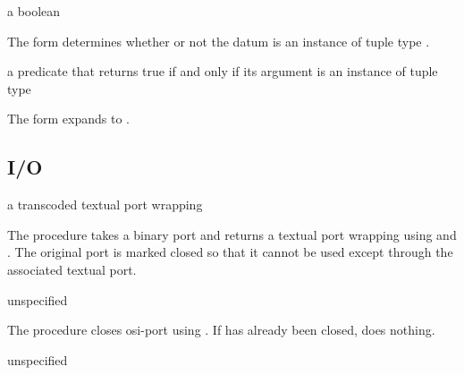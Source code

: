 \begin{syntax}
\end{syntax}
\returns{} a boolean

The  form determines whether or not the datum  is
an instance of tuple type .

\begin{syntax}
\end{syntax}
\expandsto{} a predicate that returns true if and only if its argument
is an instance of tuple type 

The  form expands to .

\subsection {I/O}

\begin{procedure}
\end{procedure}
\returns{} a transcoded textual port wrapping 

The  procedure takes a binary port  and
returns a textual port wrapping  using
 and . The
original port  is marked closed so that it cannot be used
except through the associated textual port.

\begin{procedure}
\end{procedure}
\returns{} unspecified

The  procedure closes osi-port  using
. If  has already been closed,
 does nothing.

\begin{procedure}
\end{procedure}
\returns{} unspecified

